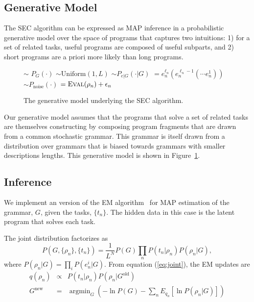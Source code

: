 \documentclass{article} %
\begin{document}
\subsection{Generative Model}
The SEC algorithm can be expressed as MAP inference in a probabilistic generative model over the space of programs that captures two intuitions: 1) for a set of related tasks, useful programs are composed of useful subparts, and 2) short programs are a priori more likely than long programs. 

\begin{figure}
\begin{codebox}
\li {} $\sim$ $P_G(\cdot)$ 
\li {} $\sim\mbox{Uniform}(1, L)$ 
\li {}
\li {} $\sim P_{e|G}(\cdot | G)$
\li {} $= e_n^{\ell_n} (e_n^{\ell_n-1} ( \cdots e_n^{1}))$
\li {}
\li {} $\sim P_{\mbox{noise}}(\cdot)$
\li {} $= \textsc{Eval}(\rho_n) + \epsilon_n$
\end{codebox}
\caption{The generative model underlying the SEC algorithm. \label{ref:gm}}
\end{figure}

Our generative model assumes that the programs that solve a set of related tasks are themselves constructing by composing program fragments that are drawn from a common stochastic grammar. This grammar is itself drawn from a distribution over grammars that is biased towards grammars with smaller descriptions lengths. This generative model is shown in Figure~\ref{ref:gm}.



\subsection{Inference}
We implement an version of the EM algorithm~\cite{dempster:1977} for MAP estimation of the grammar, $G$, given the tasks, $\{t_n\}$. The hidden data in this case is the latent program that solves each task.

The joint distribution factorizes as
\begin{equation}
P(G,\{\rho_n\},\{t_n\}) = \frac{1}{L^N} P(G) \prod_n P(t_n | \rho_n) P(\rho_n | G),
\label{eq:joint}
\end{equation}
where $P(\rho_n | G) = \prod_i P(e^i_n | G)$.
From equation (\ref{eq:joint}), the EM updates are
\begin{eqnarray}
q(\rho_n) &\propto& P(t_n | \rho_n) P(\rho_n | G^{\text{old}})\\
\label{eq:qdist}
G^{\text{new}} &=& \operatorname{argmin}_G \left( -\ln P(G) -
\sum_n 
E_{q_n}
 \left[ \ln P(\rho_n | G) \right] \right)
 \label{eq:gmax}
\end{eqnarray}
\end{document}
